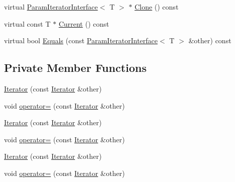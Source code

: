 \begin{DoxyCompactItemize}
\item 
virtual \mbox{\hyperlink{classtesting_1_1internal_1_1_param_iterator_interface}{Param\+Iterator\+Interface}}$<$ T $>$ $\ast$ \mbox{\hyperlink{classtesting_1_1internal_1_1_range_generator_1_1_iterator_aa3a5123fd8f2413e21dbb03327dceee0}{Clone}} () const
\item 
virtual const T $\ast$ \mbox{\hyperlink{classtesting_1_1internal_1_1_range_generator_1_1_iterator_a4a8d7908d5201913ba37b6bf2a6f9884}{Current}} () const
\item 
virtual bool \mbox{\hyperlink{classtesting_1_1internal_1_1_range_generator_1_1_iterator_a2ae0f453be98bdcfffecc3c71c7a9879}{Equals}} (const \mbox{\hyperlink{classtesting_1_1internal_1_1_param_iterator_interface}{Param\+Iterator\+Interface}}$<$ T $>$ \&other) const
\end{DoxyCompactItemize}
\subsection*{Private Member Functions}
\begin{DoxyCompactItemize}
\item 
\mbox{\hyperlink{classtesting_1_1internal_1_1_range_generator_1_1_iterator_a14150df56c79ae26f1beaea1e7548ebc}{Iterator}} (const \mbox{\hyperlink{classtesting_1_1internal_1_1_range_generator_1_1_iterator}{Iterator}} \&other)
\item 
void \mbox{\hyperlink{classtesting_1_1internal_1_1_range_generator_1_1_iterator_acd95aafca4a92db473dd4a88bbc9ab1b}{operator=}} (const \mbox{\hyperlink{classtesting_1_1internal_1_1_range_generator_1_1_iterator}{Iterator}} \&other)
\item 
\mbox{\hyperlink{classtesting_1_1internal_1_1_range_generator_1_1_iterator_a14150df56c79ae26f1beaea1e7548ebc}{Iterator}} (const \mbox{\hyperlink{classtesting_1_1internal_1_1_range_generator_1_1_iterator}{Iterator}} \&other)
\item 
void \mbox{\hyperlink{classtesting_1_1internal_1_1_range_generator_1_1_iterator_acd95aafca4a92db473dd4a88bbc9ab1b}{operator=}} (const \mbox{\hyperlink{classtesting_1_1internal_1_1_range_generator_1_1_iterator}{Iterator}} \&other)
\item 
\mbox{\hyperlink{classtesting_1_1internal_1_1_range_generator_1_1_iterator_a14150df56c79ae26f1beaea1e7548ebc}{Iterator}} (const \mbox{\hyperlink{classtesting_1_1internal_1_1_range_generator_1_1_iterator}{Iterator}} \&other)
\item 
void \mbox{\hyperlink{classtesting_1_1internal_1_1_range_generator_1_1_iterator_acd95aafca4a92db473dd4a88bbc9ab1b}{operator=}} (const \mbox{\hyperlink{classtesting_1_1internal_1_1_range_generator_1_1_iterator}{Iterator}} \&other)
\end{DoxyCompactItemize}
